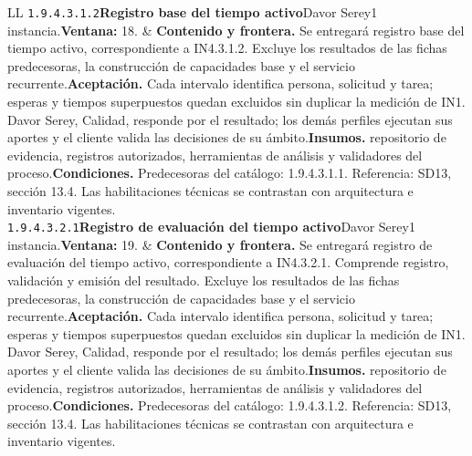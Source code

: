 \begin{longtable}{L{\tabcolsep\relax}L{\tabcolsep\relax}}
\texttt{1.\allowbreak{}9.\allowbreak{}4.\allowbreak{}3.\allowbreak{}1.\allowbreak{}2}\newline{}\textbf{Registro base del tiempo activo}\newline{}Davor Serey\newline{}1 instancia.\newline{}\textbf{Ventana:} 18. & \textbf{Contenido y frontera.} Se entregará registro base del tiempo activo, correspondiente a IN4.3.1.2. Excluye los resultados de las fichas predecesoras, la construcción de capacidades base y el servicio recurrente.\newline{}\textbf{Aceptación.} Cada intervalo identifica persona, solicitud y tarea; esperas y tiempos superpuestos quedan excluidos sin duplicar la medición de IN1. Davor Serey, Calidad, responde por el resultado; los demás perfiles ejecutan sus aportes y el cliente valida las decisiones de su ámbito.\newline{}\textbf{Insumos.} repositorio de evidencia, registros autorizados, herramientas de análisis y validadores del proceso.\newline{}\textbf{Condiciones.} Predecesoras del catálogo: 1.9.4.3.1.1. Referencia: SD13, sección 13.4. Las habilitaciones técnicas se contrastan con arquitectura e inventario vigentes.\\\hline
\texttt{1.\allowbreak{}9.\allowbreak{}4.\allowbreak{}3.\allowbreak{}2.\allowbreak{}1}\newline{}\textbf{Registro de evaluación del tiempo activo}\newline{}Davor Serey\newline{}1 instancia.\newline{}\textbf{Ventana:} 19. & \textbf{Contenido y frontera.} Se entregará registro de evaluación del tiempo activo, correspondiente a IN4.3.2.1. Comprende registro, validación y emisión del resultado. Excluye los resultados de las fichas predecesoras, la construcción de capacidades base y el servicio recurrente.\newline{}\textbf{Aceptación.} Cada intervalo identifica persona, solicitud y tarea; esperas y tiempos superpuestos quedan excluidos sin duplicar la medición de IN1. Davor Serey, Calidad, responde por el resultado; los demás perfiles ejecutan sus aportes y el cliente valida las decisiones de su ámbito.\newline{}\textbf{Insumos.} repositorio de evidencia, registros autorizados, herramientas de análisis y validadores del proceso.\newline{}\textbf{Condiciones.} Predecesoras del catálogo: 1.9.4.3.1.2. Referencia: SD13, sección 13.4. Las habilitaciones técnicas se contrastan con arquitectura e inventario vigentes.\\\hline

\end{longtable}
